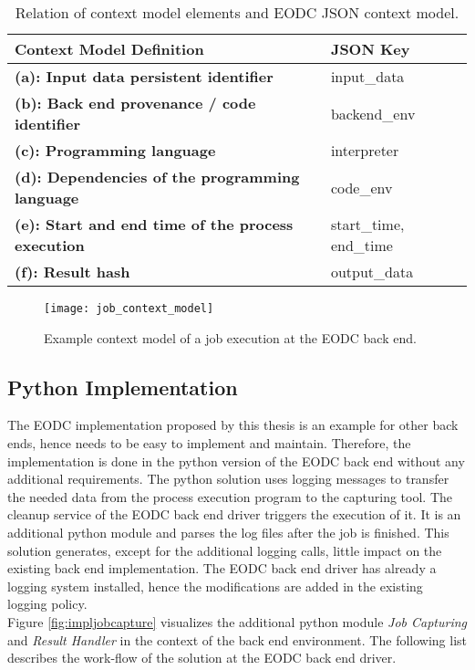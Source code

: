 \documentclass[draft,final]{vutinfth} %
\begin{document}
\begin{table}[]
	\caption{Relation of context model elements and EODC JSON context model.}
	\begin{tabular}{l|l}
		\textbf{Context Model Definition} & \textbf{JSON Key} \\ \hline
		\textbf{(a): Input data persistent identifier} & input\_data \\ \hline
		\textbf{(b): Back end provenance / code identifier} & backend\_env \\ \hline
		\textbf{(c): Programming language} & interpreter \\ \hline
		\textbf{(d): Dependencies of the programming language} & code\_env \\ \hline
		\textbf{(e): Start and end time of the process execution} & start\_time, end\_time \\ \hline
		\textbf{(f): Result hash} & output\_data \\ %
	\end{tabular}
\label{Tab:contextmodel}
\end{table}

\begin{figure}[h]
	\centering
	\texttt{[image: job\_context\_model]}
	\caption{Example context model of a job execution at the EODC back end.}
	\label{fig:job_context_model} %
\end{figure}

\subsection{Python Implementation}\label{Implementation:Python Implementation}
The EODC implementation proposed by this thesis is an example for other back ends, hence needs to be easy to implement and maintain. Therefore, the implementation is done in the python version of the EODC back end without any additional requirements. The python solution uses logging messages to transfer the needed data from the process execution program to the capturing tool. The cleanup service of the EODC back end driver triggers the execution of it. It is an additional python module and parses the log files after the job is finished. This solution generates, except for the additional logging calls, little impact on the existing back end implementation. The EODC back end driver has already a logging system installed, hence the modifications are added in the existing logging policy. \\
Figure \ref{fig:impljobcapture} visualizes the additional python module \textit{Job Capturing} and \textit{Result Handler} in the context of the back end environment. The following list describes the work-flow of the solution at the EODC back end driver. 
\end{document}
